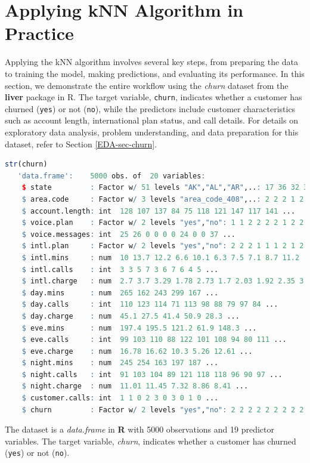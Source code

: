 \documentclass[
]{book}
\newcommand{\passthrough}[1]{#1}
\theoremstyle{definition}
\theoremstyle{definition}
\theoremstyle{definition}
\theoremstyle{definition}
\theoremstyle{remark}
\begin{document}
\section{Applying kNN Algorithm in Practice}\label{sec-kNN-churn}

Applying the kNN algorithm involves several key steps, from preparing the data to training the model, making predictions, and evaluating its performance. In this section, we demonstrate the entire workflow using the \emph{churn} dataset from the \textbf{liver} package in R. The target variable, \passthrough{\lstinline!churn!}, indicates whether a customer has churned (\passthrough{\lstinline!yes!}) or not (\passthrough{\lstinline!no!}), while the predictors include customer characteristics such as account length, international plan status, and call details. For details on exploratory data analysis, problem understanding, and data preparation for this dataset, refer to Section \ref{EDA-sec-churn}.

\begin{lstlisting}[language=R]
str(churn)
   'data.frame':    5000 obs. of  20 variables:
    $ state         : Factor w/ 51 levels "AK","AL","AR",..: 17 36 32 36 37 2 20 25 19 50 ...
    $ area.code     : Factor w/ 3 levels "area_code_408",..: 2 2 2 1 2 3 3 2 1 2 ...
    $ account.length: int  128 107 137 84 75 118 121 147 117 141 ...
    $ voice.plan    : Factor w/ 2 levels "yes","no": 1 1 2 2 2 2 1 2 2 1 ...
    $ voice.messages: int  25 26 0 0 0 0 24 0 0 37 ...
    $ intl.plan     : Factor w/ 2 levels "yes","no": 2 2 2 1 1 1 2 1 2 1 ...
    $ intl.mins     : num  10 13.7 12.2 6.6 10.1 6.3 7.5 7.1 8.7 11.2 ...
    $ intl.calls    : int  3 3 5 7 3 6 7 6 4 5 ...
    $ intl.charge   : num  2.7 3.7 3.29 1.78 2.73 1.7 2.03 1.92 2.35 3.02 ...
    $ day.mins      : num  265 162 243 299 167 ...
    $ day.calls     : int  110 123 114 71 113 98 88 79 97 84 ...
    $ day.charge    : num  45.1 27.5 41.4 50.9 28.3 ...
    $ eve.mins      : num  197.4 195.5 121.2 61.9 148.3 ...
    $ eve.calls     : int  99 103 110 88 122 101 108 94 80 111 ...
    $ eve.charge    : num  16.78 16.62 10.3 5.26 12.61 ...
    $ night.mins    : num  245 254 163 197 187 ...
    $ night.calls   : int  91 103 104 89 121 118 118 96 90 97 ...
    $ night.charge  : num  11.01 11.45 7.32 8.86 8.41 ...
    $ customer.calls: int  1 1 0 2 3 0 3 0 1 0 ...
    $ churn         : Factor w/ 2 levels "yes","no": 2 2 2 2 2 2 2 2 2 2 ...
\end{lstlisting}

The dataset is a \emph{data.frame} in \textbf{R} with 5000 observations and 19 predictor variables. The target variable, \emph{churn}, indicates whether a customer has churned (\passthrough{\lstinline!yes!}) or not (\passthrough{\lstinline!no!}).
\end{document}
